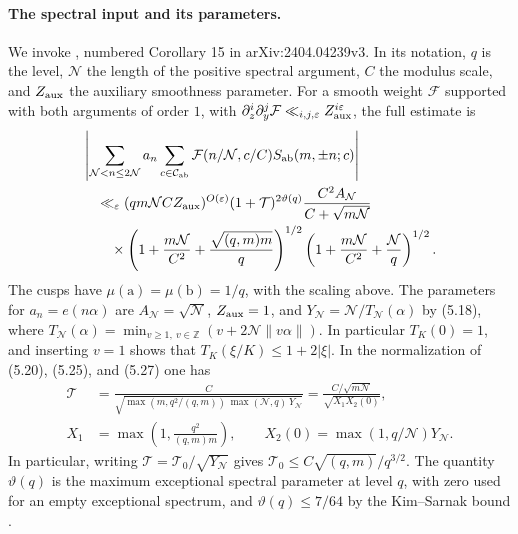 \documentclass[11pt]{amsart}
\numberwithin{equation}{section}
\theoremstyle{remark}
\begin{document}
\paragraph{The spectral input and its parameters.}
We invoke \cite[Corollary 5.5, (5.20)]{PascadiPi}, numbered
Corollary 15 in arXiv:2404.04239v3. In its notation, \(q\) is the
level, \(\mathcal N\) the length of the positive spectral argument,
\(C\) the modulus scale, and \(Z_{\rm aux}\) the auxiliary smoothness
parameter. For a smooth weight \(\mathcal F\) supported with both
arguments of order \(1\), with
\(\partial_z^i\partial_y^j\mathcal F\ll_{i,j,\varepsilon}
Z_{\rm aux}^{i\varepsilon}\), the full estimate is
\begin{align}
 &\left|
 \sum_{\mathcal N<n\le2\mathcal N}a_n
 \sum_{c\in\mathcal C_{\mathrm{ab}}}
 \mathcal F(n/\mathcal N,c/C)S_{\mathrm{ab}}(m,\pm n;c)
 \right| \notag\\
 &\quad\ll_\varepsilon (qm\mathcal N C Z_{\rm aux})^{O(\varepsilon)}
 (1+\mathcal T)^{2\vartheta(q)}
 \frac{C^2 A_{\mathcal N}}{C+\sqrt{m\mathcal N}}\notag\\
 &\qquad{}\times
 \left(1+\frac{m\mathcal N}{C^2}+
       \frac{\sqrt{(q,m)m}}q\right)^{1/2}
 \left(1+\frac{m\mathcal N}{C^2}+
       \frac{\mathcal N}q\right)^{1/2}.
 \label{eq:pascadi-completion}
\end{align}
The cusps have \(\mu(\mathrm a)=\mu(\mathrm b)=1/q\), with
the scaling above. The parameters for \(a_n=e(n\alpha)\) are
\(A_{\mathcal N}=\sqrt{\mathcal N}\), \(Z_{\rm aux}=1\), and
\(Y_{\mathcal N}=\mathcal N/T_{\mathcal N}(\alpha)\) by (5.18), where
\(T_{\mathcal N}(\alpha)=
\min_{v\ge1,\ v\in\mathbb Z}(v+2\mathcal N\|v\alpha\|)\).
In particular \(T_K(0)=1\), and inserting \(v=1\) shows that
\(T_K(\xi/K)\le1+2|\xi|\).
In the normalization of (5.20), (5.25), and (5.27) one has
\[
 \begin{aligned}
 \mathcal T &=
 \frac{C}{\sqrt{\max(m,q^2/(q,m))\,\max(\mathcal N,q)\,
                        Y_{\mathcal N}}}
   =\frac{C/\sqrt{m\mathcal N}}{\sqrt{X_1X_2(0)}},\\
 X_1&=\max\!\left(1,\frac{q^2}{(q,m)m}\right),\qquad
 X_2(0)=\max(1,q/\mathcal N)Y_{\mathcal N}.
 \end{aligned}
\]
In particular, writing \(\mathcal T=\mathcal T_0/\sqrt{Y_{\mathcal N}}\)
gives \(\mathcal T_0\le C\sqrt{(q,m)}/q^{3/2}\).
The quantity \(\vartheta(q)\) is the maximum exceptional spectral
parameter at level \(q\), with zero used for an empty exceptional
spectrum, and \(\vartheta(q)\le7/64\) by the Kim--Sarnak bound
\cite[Theorem 3.3]{PascadiPi}.
\end{document}
